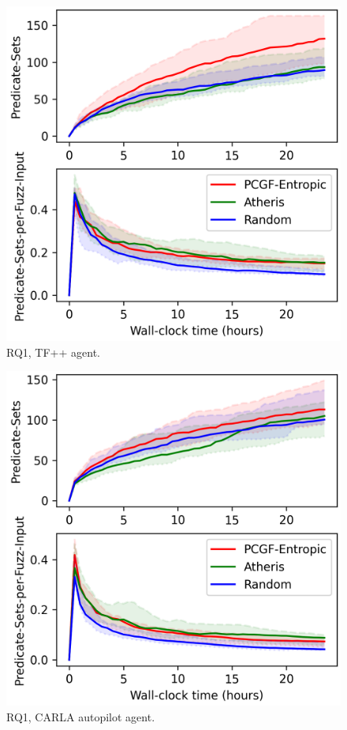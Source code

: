 \begin{figure}
    \centering
    \includegraphics[width=0.6\linewidth]{figures/chapter5/RQ1/(PCGF-Entropic,Atheris,Random)_TFPP_all-coverage_(Predicate-Sets,Predicate-Sets-per-Fuzz-Input).png}
    \caption{RQ1, TF++ agent.}
    \label{fig:RQ1-TFPP}
\end{figure}

\begin{figure}
    \centering
    \includegraphics[width=0.6\linewidth]{figures/chapter5/RQ1/(PCGF-Entropic,Atheris,Random)_autopilot_all-coverage_(Predicate-Sets,Predicate-Sets-per-Fuzz-Input).png}
    \caption{RQ1, CARLA autopilot agent.}
    \label{fig:RQ1-autopilot}
\end{figure}

